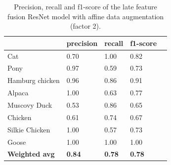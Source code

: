 \documentclass{l4proj}
\begin{document}
\begin{appendices}
\begin{table}[H]
  \centering
  \begin{tabular}{@{}lllll@{}}
  \toprule
                        & \textbf{precision} & \textbf{recall} & \textbf{f1-score} &  \\ \midrule
  Cat                   & 0.70               & 1.00            & 0.82              &  \\
  Pony                  & 0.97               & 0.59            & 0.73              &  \\
  Hamburg chicken       & 0.96               & 0.86            & 0.91              &  \\
  Alpaca                & 1.00               & 0.63            & 0.77              &  \\
  Muscovy Duck          & 0.53               & 0.86            & 0.65              &  \\
  Chicken               & 0.61               & 0.74            & 0.67              &  \\
  Silkie Chicken        & 1.00               & 0.57            & 0.73              &  \\
  Goose                 & 1.00               & 1.00            & 1.00              &  \\
  \midrule
  \textbf{Weighted avg} & \textbf{0.84}      & \textbf{0.78}   & \textbf{0.78}     &  \\ \bottomrule
  \end{tabular}
  \caption{Precision, recall and f1-score of the late feature fusion ResNet model with affine data augmentation (factor 2).}
  \label{table:appendix_affine_2}
\end{table}


\end{appendices}
\end{document}
